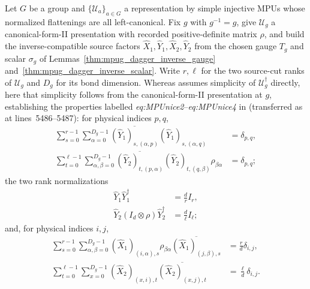 \begin{lemma}
    \label{thm:mpug_involutive_source_properties}
    \leanok
    Let $G$ be a group and $\{\mathcal U_a\}_{a\in G}$ a representation by
    simple injective MPUs whose normalized flattenings are all
    left-canonical. Fix $g$ with $g^{-1}=g$, give $\mathcal U_g$ a
    canonical-form-II presentation with recorded positive-definite matrix
    $\rho$, and build the inverse-compatible source factors
    $\widehat X_1,\widehat Y_1,\widehat X_2,\widehat Y_2$ from the chosen
    gauge $T_g$ and scalar $\sigma_g$ of
    Lemmas~\ref{thm:mpug_dagger_inverse_gauge}
    and~\ref{thm:mpug_dagger_inverse_scalar}. Write $r,\ell$ for the two
    source-cut ranks of $\mathcal U_g$ and $D_g$ for its bond dimension.
    Whereas \cite[line~5344]{FrancoRubio2025MPUGauging} assumes simplicity of
    $\mathcal U_g^\dagger$ directly, here that simplicity follows from the
    canonical-form-II presentation at $g$, establishing the properties labelled
    \emph{eq:MPUnice2}--\emph{eq:MPUnice4} in
    \cite[lines~1064--1162]{FrancoRubio2025MPUGauging} (transferred as at
    lines~5486--5487): for physical indices $p,q$,
    \begin{align}
        \sum_{s=0}^{r-1}\sum_{\alpha=0}^{D_g-1}
        \overline{(\widehat Y_1)_{s,(\alpha,p)}}
        (\widehat Y_1)_{s,(\alpha,q)}
         & =\delta_{p,q}, \\
        \sum_{t=0}^{\ell-1}\sum_{\alpha,\beta=0}^{D_g-1}
        \overline{(\widehat Y_2)_{t,(p,\alpha)}}
        (\widehat Y_2)_{t,(q,\beta)}\rho_{\beta\alpha}
         & =\delta_{p,q};
    \end{align}
    the two rank normalizations
    \begin{align}
        \widehat Y_1\widehat Y_1^\dagger & =\frac{d}{r}I_r,       \\
        \widehat Y_2(I_d\otimes\rho)\widehat Y_2^\dagger
                                         & =\frac{d}{\ell}I_\ell;
    \end{align}
    and, for physical indices $i,j$,
    \begin{align}
        \sum_{s=0}^{r-1}\sum_{\alpha,\beta=0}^{D_g-1}
        (\widehat X_1)_{(i,\alpha),s}\rho_{\beta\alpha}
        \overline{(\widehat X_1)_{(j,\beta),s}}
         & =\frac{r}{d}\delta_{i,j},    \\
        \sum_{t=0}^{\ell-1}\sum_{x=0}^{D_g-1}
        (\widehat X_2)_{(x,i),t}\overline{(\widehat X_2)_{(x,j),t}}
         & =\frac{\ell}{d}\delta_{i,j}.
    \end{align}
\end{lemma}
